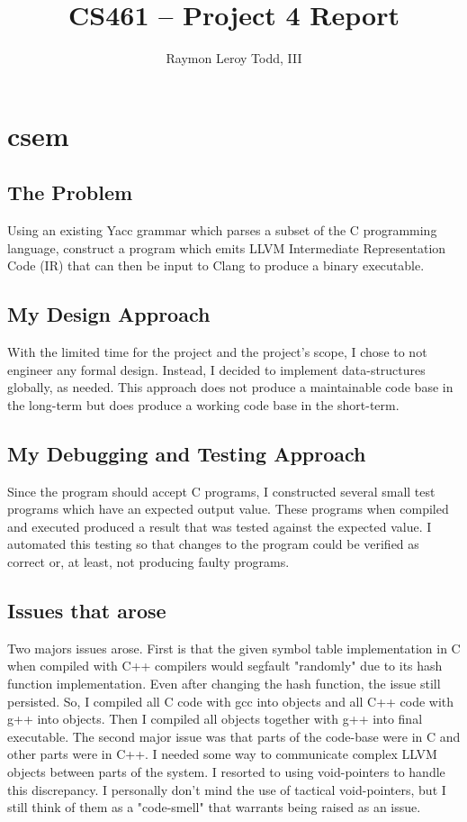 \documentclass[12pt]{article}
\author{Raymon Leroy Todd, III}
\title{CS461 -- Project 4 Report}
\begin{document}
	\maketitle
	\pagebreak
	\section{csem}

	\subsection{The Problem}
    Using an existing Yacc grammar which parses a subset of the C programming
    language, construct a program which emits LLVM Intermediate Representation
    Code (IR) that can then be input to Clang to produce a binary executable.

	\subsection{My Design Approach}
    With the limited time for the project and the project's scope, I chose to
    not engineer any formal design. Instead, I decided to implement
    data-structures globally, as needed.  This approach does not produce a
    maintainable code base in the long-term but does produce a working code
    base in the short-term.

    \subsection{My Debugging and Testing Approach}
    Since the program should accept C programs, I constructed several small
    test programs which have an expected output value. These programs when
    compiled and executed produced a result that was tested against the
    expected value.  I automated this testing so that changes to the program
    could be verified as correct or, at least, not producing faulty programs.

    \subsection{Issues that arose}
    Two majors issues arose. First is that the given symbol table
    implementation in C when compiled with C++ compilers would segfault
    "randomly" due to its hash function implementation.
    Even after changing the hash function, the issue still persisted. So, I
    compiled all C code with gcc into objects and all C++ code with g++ into
    objects. Then I compiled all objects together with g++ into final
    executable.
    The second major issue was that parts of the code-base were in C and other
    parts were in C++. I needed some way to communicate complex LLVM objects
    between parts of the system. I resorted to using void-pointers to handle
    this discrepancy.  I personally don't mind the use of tactical
    void-pointers, but I still think of them as a "code-smell" that warrants
    being raised as an issue.
\end{document}

